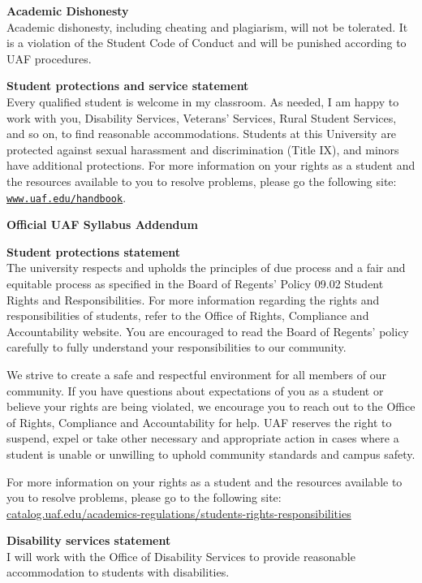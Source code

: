 \documentclass[12pt]{article}
\renewcommand{\emph}[1]{\textsf{\textbf{#1}}}
\newcommand{\localhead}[1]{\par\smallskip\textbf{#1} \smallskip\nobreak\\}%
\def\heading#1{\localhead{\large\emph{#1}}}
\def\subheading#1{\localhead{\emph{#1}}}
\begin{document}
\subheading{Academic Dishonesty}
Academic dishonesty, including cheating and plagiarism, will not be tolerated.  It is a violation of the Student Code of Conduct and will be punished according to UAF procedures.

\subheading{Student protections and service statement}
Every qualified student is welcome in my classroom.  As needed, I am happy to work with you, Disability Services, Veterans' Services, Rural Student Services, and so on, to find reasonable accommodations.  Students at this University are protected against sexual harassment and discrimination (Title IX), and minors have additional protections.  For more information on your rights as a student and the resources available to you to resolve problems, please go the following site: \href{https://www.uaf.edu/handbook/}{\texttt{www.uaf.edu/handbook}}.

\phantom{foo}

\heading{Official UAF Syllabus Addendum}
\vskip -15pt

\subheading{Student protections statement} The university respects and upholds the principles of due process and a fair and equitable process as specified in the Board of Regents' Policy 09.02 Student Rights and Responsibilities. For more information regarding the rights and responsibilities of students, refer to the Office of Rights, Compliance and Accountability website. You are encouraged to read the Board of Regents' policy carefully to fully understand your responsibilities to our community.

We strive to create a safe and respectful environment for all members of our community. If you have questions about expectations of you as a student or believe your rights are being violated, we encourage you to reach out to the  Office of Rights, Compliance and Accountability for help. UAF reserves the right to suspend, expel or take other necessary and appropriate action in cases where a student is unable or unwilling to uphold community standards and campus safety.

For more information on your rights as a student and the resources available to you to resolve problems, please go to the following site: \href{https://catalog.uaf.edu/academics-regulations/students-rights-responsibilities/}{catalog.uaf.edu/academics-regulations/students-rights-responsibilities}

\subheading{Disability services statement} I will work with the Office of Disability Services to provide reasonable accommodation to students with disabilities.
\end{document}
